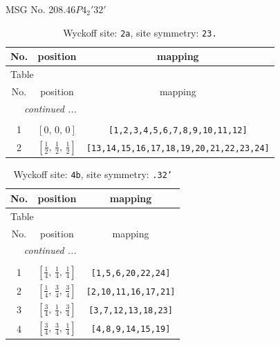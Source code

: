 \documentclass[fleqn,8pt]{jsarticle}
\begin{document}
\setcounter{MaxMatrixCols}{32}

\renewcommand{\tablename}{Table~}
\renewcommand{\figurename}{Figure~}
\begin{center}
\LARGE
MSG No. 208.46\quad$P4_{2}'32'$
\end{center}
\renewcommand{\arraystretch}{1.2}
\begin{longtable}{ccc}
\caption{Wyckoff site: {\tt 2a}, site symmetry: {\tt 23.}}
 \\
 \hline \hline
No. & position & mapping \\ \hline \endfirsthead

\multicolumn{2}{l}{\tablename\ \thetable{}} \\
 \hline \hline
No. & position & mapping \\ \hline \endhead

 \hline \hline
\multicolumn{2}{r}{\footnotesize\it continued ...} \\ \endfoot

 \hline \hline
\multicolumn{2}{r}{} \\ \endlastfoot

1 & $\left[ 0,\, 0,\, 0 \right]$ & {\tt [1,2,3,4,5,6,7,8,9,10,11,12]} \\ \hline
2 & $\left[ \frac{1}{2},\, \frac{1}{2},\, \frac{1}{2} \right]$ & {\tt [13,14,15,16,17,18,19,20,21,22,23,24]} \\
\end{longtable}
\renewcommand{\arraystretch}{1.2}
\begin{longtable}{ccc}
\caption{Wyckoff site: {\tt 4b}, site symmetry: {\tt .32'}}
 \\
 \hline \hline
No. & position & mapping \\ \hline \endfirsthead

\multicolumn{2}{l}{\tablename\ \thetable{}} \\
 \hline \hline
No. & position & mapping \\ \hline \endhead

 \hline \hline
\multicolumn{2}{r}{\footnotesize\it continued ...} \\ \endfoot

 \hline \hline
\multicolumn{2}{r}{} \\ \endlastfoot

1 & $\left[ \frac{1}{4},\, \frac{1}{4},\, \frac{1}{4} \right]$ & {\tt [1,5,6,20,22,24]} \\ \hline
2 & $\left[ \frac{1}{4},\, \frac{3}{4},\, \frac{3}{4} \right]$ & {\tt [2,10,11,16,17,21]} \\ \hline
3 & $\left[ \frac{3}{4},\, \frac{1}{4},\, \frac{3}{4} \right]$ & {\tt [3,7,12,13,18,23]} \\ \hline
4 & $\left[ \frac{3}{4},\, \frac{3}{4},\, \frac{1}{4} \right]$ & {\tt [4,8,9,14,15,19]} \\
\end{longtable}
\end{document}
